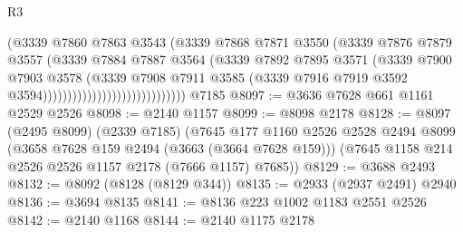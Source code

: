 \begin{lexlean}{R3}
\begin{coremodule}
                                              (@3339
                                                @7860
                                                @7863
                                                @3543
                                                (@3339
                                                  @7868
                                                  @7871
                                                  @3550
                                                  (@3339
                                                    @7876
                                                    @7879
                                                    @3557
                                                    (@3339
                                                      @7884
                                                      @7887
                                                      @3564
                                                      (@3339
                                                        @7892
                                                        @7895
                                                        @3571
                                                        (@3339
                                                          @7900
                                                          @7903
                                                          @3578
                                                          (@3339
                                                            @7908
                                                            @7911
                                                            @3585
                                                            (@3339
                                                              @7916
                                                              @7919
                                                              @3592
                                                              @3594)))))))))))))))))))))))))))))
    @7185
@8097 := @3636 @7628 @661 @1161 @2529 @2526
@8098 := @2140 @1157
@8099 := @8098 @2178
@8128 := @8097
    (@2495 @8099)
    (@2339 @7185)
    (@7645
      @177
      @1160
      @2526
      @2528
      @2494
      @8099
      (@3658 @7628 @159 @2494 (@3663 (@3664 @7628 @159)))
      (@7645 @1158 @214 @2526 @2526 @1157 @2178 (@7666 @1157) @7685))
@8129 := @3688 @2493
@8132 := @8092 (@8128 (@8129 @344))
@8135 := @2933 (@2937 @2491) @2940
@8136 := @3694 @8135
@8141 := @8136 @223 @1002 @1183 @2551 @2526
@8142 := @2140 @1168
@8144 := @2140 @1175 @2178

\end{coremodule}
\end{lexlean}

